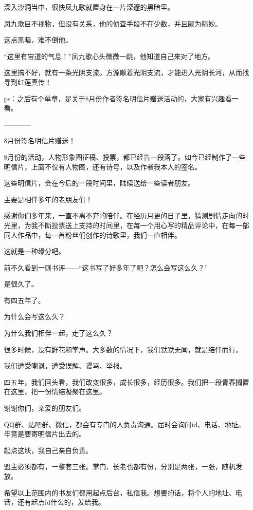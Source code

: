 \begin{this_body}
深入沙洞当中，很快凤九歌就置身在一片深邃的黑暗里。

凤九歌目不视物，但没有关系，他的侦查手段不在少数，并且颇为精妙。

这点黑暗，难不倒他。

“这里有宙道的气息！”凤九歌心头微微一跳，他知道自己来对了地方。

这里搞不好，就有一条光阴支流。方源顺着光阴支流，才能进入光阴长河，从而找寻到红莲真传！

ps：之后有个单章，是关于8月份作者签名明信片赠送活动的，大家有兴趣看一看。

------------

8月份签名明信片赠送！

8月份的活动，人物形象图征稿、投票，都已经告一段落了。如今已经制作了一些明信片，上面不仅有人物图，还有诗号，以及作者我本人的签名。

这些明信片，会在今后的一段时间里，陆续送给一些读者朋友。

主要是相伴多年的老朋友们！

感谢你们多年来，一直不离不弃的陪伴。在经历月更的日子里，猜测剧情走向的时光里，为我不断投票送上支持的时间里，在每一个用心写的精品评论中，在每一部同人作品中，每一首粉丝们创作的诗歌里，我们一直相伴。

这就是一种缘分吧。

前不久看到一则书评——“这书写了好多年了吧？怎么会写这么久？”

是很久了。

有四五年了。

为什么会写这么久？

为什么我们相伴一起，走了这么久？

很多时候，没有鲜花和掌声。大多数的情况下，我们默默无闻，就是结伴而行。

我们遭受嘲讽，遭受误解、谩骂、举报。

四五年，我们回头看，我们改变很多，成长很多，经历很多。我们把一段青春搁置在这里，把一份情结凝聚在这里。

谢谢你们，亲爱的朋友们。

QQ群、贴吧群、微信，都会有专门的人负责沟通。届时会询问id、电话、地址。毕竟是要寄明信片出去的。

起点这块，我自己亲自负责。

盟主必须都有，一整套三张。掌门、长老也都有份，分别是两张，一张，随机发放。

希望以上范围内的书友们都用起点后台，私信我。想要的话，将个人的地址、电话，还有起点id什么的，发给我。


\end{this_body}
